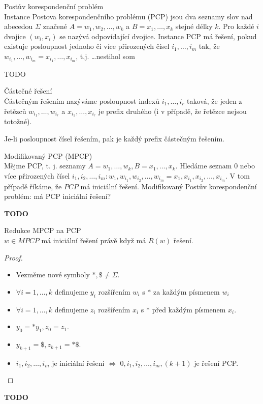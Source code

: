 \documentclass[../main.tex]{subfiles}
\begin{document}
\begin{definition}
    Postův korespondenční problém\\

    Instance Postova korespondenčního problému (PCP) jsou dva seznamy slov nad abecedou $\Sigma$ značené $A = w_1,w_2,\dots, w_k$ a $B = x_1,\dots,x_k$ stejné délky $k$.
    Pro každé $i$ dvojice $(w_i,x_i)$ se nazývá odpovídající dvojice.
    Instance PCP má řešení, pokud existuje posloupnost jednoho či více přirozených čísel $i_1,\dots,i_m$ tak, že $w_{i_1},\dots,w_{i_m} =x_{i_1},\dots,x_{i_m}$, t.j. \dots nestihol som
\end{definition}
\begin{example}
    TODO
\end{example}
\begin{definition}
    Částečné řešení\\
    Částečným řešením nazýváme posloupnost indexů $i_1,\dots,i_r$ taková, že jeden z řetězců $w_{i_1},\dots,w_{i_r}$ a $x_{i_1},\dots,x_{i_r}$ je prefix druhého (i v případě, že řetězce nejsou totožné).
\end{definition}
\begin{theorem}
    Je-li posloupnost čísel řešením, pak je každý prefix částečným řešením.
\end{theorem}
\begin{definition}
    Modifikovaný PCP (MPCP)\\
    Mějme PCP, t. j. seznamy $A = w_1,\dots,w_k, B = x_1,\dots,x_k$. Hledáme seznam 0 nebo více přirozených čísel $i_1,i_2,\dots,i_m : w_1,w_{i_1},w_{i_2},\dots,w_{i_m} = x_1,x_{i_1},x_{i_2},\dots,x_{i_m}$. V tom případě
    říkáme, že $PCP$ má iniciální řešení. Modifikovaný Postův korespondenční problém: má PCP iniciální řešení?
\end{definition}
\begin{example}
    \textbf{TODO}
\end{example}
\begin{theorem}
    Redukce MPCP na PCP\\
    $w\in MPCP$ má iniciální řešení právě když má $R(w)$ řešení.
    \begin{proof}
        \begin{itemize}
            \item Vezměme nové symboly $\ast, \$ \neq \Sigma$.
            \item $\forall i = 1,\dots,k$ definujeme $y_i$ rozšířením $w_i$ s $\ast$ za každým písmenem $w_i$
            \item $\forall i = 1,\dots,k$ definujeme $z_i$ rozšířením $x_i$ s $\ast$ před každým písmenem $x_i$.
            \item $y_0 = \ast y_1, z_0 = z_1$.
            \item $y_{k+1} = \$, z_{k+1} = \ast \$$.
            \item $i_1,i_2,\dots,i_m$ je iniciální řešení $\Leftrightarrow$ $0,i_1,i_2,\dots,i_m, (k+1)$ je řešení PCP.
        \end{itemize}
    \end{proof}
    \begin{example}
        \textbf{TODO}
    \end{example}
\end{theorem}
\end{document}
